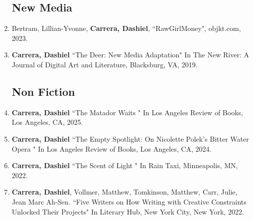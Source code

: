 \begin{enumerate}
\subsection{New Media}
\item Bertram, Lillian-Yvonne, \textbf{Carrera, Dashiel}, ``RawGirlMoney", objkt.com, 2023.
\item \textbf{Carrera, Dashiel} ``The Deer: New Media Adaptation" In The New River: A Journal of Digital Art and Literature, Blacksburg, VA, 2019.\\

\subsection{Non Fiction}


\item \textbf{Carrera, Dashiel} ``The Matador Waits " In Los Angeles Review of Books, Los Angeles, CA, 2025.\\

\item \textbf{Carrera, Dashiel} ``The Empty Spotlight: On Nicolette Polek's Bitter Water Opera " In Los Angeles Review of Books, Los Angeles, CA, 2024.\\

\item \textbf{Carrera, Dashiel} ``The Scent of Light " In Rain Taxi, Minneapolis, MN, 2022.\\
%
\item \textbf{Carrera, Dashiel}, Vollmer, Matthew, Tomkinson, Matthew, Carr, Julie, Jean Marc Ah-Sen. ``Five Writers on How Writing with Creative Constraints Unlocked Their Projects" In Literary Hub, New York City, New York, 2022.\\





\end{enumerate}
